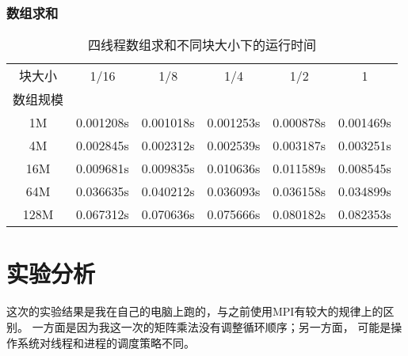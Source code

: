 \documentclass{SYSUReport}
\begin{document}
\subsubsection{数组求和}

\begin{table}[h]
\centering
\caption{四线程数组求和不同块大小下的运行时间}
\begin{tabular}{cccccc}
\toprule
块大小 & 1/16 & 1/8 & 1/4 & 1/2 & 1 \\
数组规模 & & & & &\\
\midrule
1M &0.001208s &0.001018s &0.001253s &0.000878s &0.001469s \\
4M &0.002845s &0.002312s &0.002539s &0.003187s &0.003251s \\
16M &0.009681s &0.009835s &0.010636s &0.011589s &0.008545s \\
64M &0.036635s &0.040212s &0.036093s &0.036158s &0.034899s \\
128M &0.067312s &0.070636s &0.075666s &0.080182s &0.082353s \\

\bottomrule
\end{tabular}
\end{table}


\section{实验分析}
这次的实验结果是我在自己的电脑上跑的，与之前使用MPI有较大的规律上的区别。
一方面是因为我这一次的矩阵乘法没有调整循环顺序；另一方面，
可能是操作系统对线程和进程的调度策略不同。
\end{document}
